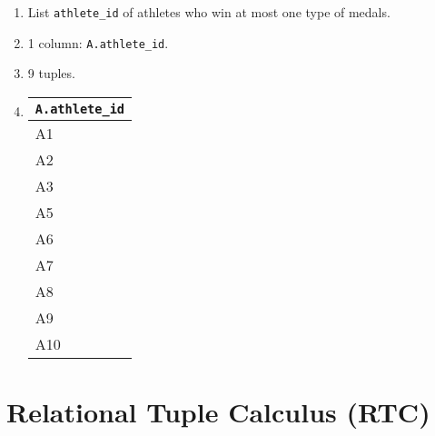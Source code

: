 \documentclass{homework}
\begin{document}
\begin{enumerate}
    \begin{enumerate}
        \item List \texttt{athlete\_id} of athletes who win at most one type of medals.
        \item 1 column: \texttt{A.athlete\_id}.
        \item 9 tuples.
        \item 
        \begin{tabular}{@{}l@{}}
            \toprule
            \texttt{A.athlete\_id} \\ \midrule
            A1          \\
            A2          \\
            A3          \\
            A5          \\
            A6          \\
            A7          \\
            A8          \\
            A9          \\
            A10         \\ \bottomrule
        \end{tabular}
    \end{enumerate}
\end{enumerate}
\newpage

\section{Relational Tuple Calculus (RTC)}
\end{document}
